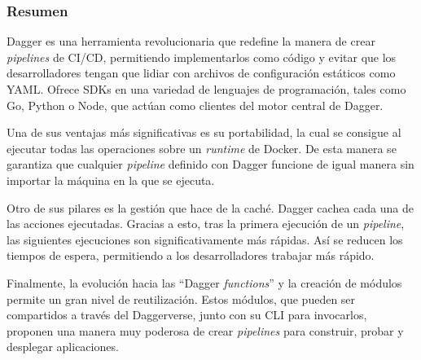 \subsubsection*{Resumen}

Dagger es una herramienta revolucionaria que redefine la manera de crear \textit{pipelines} de CI/CD, permitiendo implementarlos como código y evitar que los desarrolladores tengan que lidiar con archivos de configuración estáticos como YAML. Ofrece SDKs en una variedad de lenguajes de programación, tales como Go, Python o Node, que actúan como clientes del motor central de Dagger.

Una de sus ventajas más significativas es su portabilidad, la cual se consigue al ejecutar todas las operaciones sobre un \textit{runtime} de Docker. De esta manera se garantiza que cualquier \textit{pipeline} definido con Dagger funcione de igual manera sin importar la máquina en la que se ejecuta.

Otro de sus pilares es la gestión que hace de la caché. Dagger cachea cada una de las acciones ejecutadas. Gracias a esto, tras la primera ejecución de un \textit{pipeline}, las siguientes ejecuciones son significativamente más rápidas. Así se reducen los tiempos de espera, permitiendo a los desarrolladores trabajar más rápido.

Finalmente, la evolución hacia las ``Dagger \textit{functions}'' y la creación de módulos permite un gran nivel de reutilización. Estos módulos, que pueden ser compartidos a través del Daggerverse, junto con su CLI para invocarlos, proponen una manera muy poderosa de crear \textit{pipelines} para construir, probar y desplegar aplicaciones.
